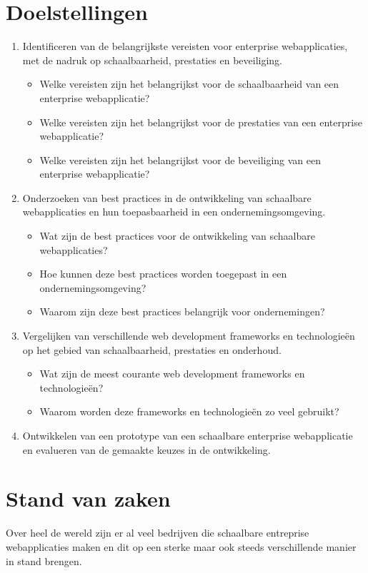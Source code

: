 \documentclass{hogent-article}
\begin{document}
\begin{samenvatting}
\section*{Doelstellingen}
\begin{enumerate}
  \item Identificeren van de belangrijkste vereisten voor enterprise webapplicaties, met de nadruk op schaalbaarheid, prestaties en beveiliging.
    \begin{itemize}
      \item Welke vereisten zijn het belangrijkst voor de schaalbaarheid van een enterprise webapplicatie?
      \item Welke vereisten zijn het belangrijkst voor de prestaties van een enterprise webapplicatie?
      \item Welke vereisten zijn het belangrijkst voor de beveiliging van een enterprise webapplicatie?
    \end{itemize}
  \item Onderzoeken van best practices in de ontwikkeling van schaalbare webapplicaties en hun toepasbaarheid in een ondernemingsomgeving.
    \begin{itemize}
      \item Wat zijn de best practices voor de ontwikkeling van schaalbare webapplicaties?
      \item Hoe kunnen deze best practices worden toegepast in een ondernemingsomgeving?
      \item Waarom zijn deze best practices belangrijk voor ondernemingen?
    \end{itemize}
  \item Vergelijken van verschillende web development frameworks en technologieën op het gebied van schaalbaarheid, prestaties en onderhoud.
    \begin{itemize}
      \item Wat zijn de meest courante web development frameworks en technologieën?
      \item Waarom worden deze frameworks en technologieën zo veel gebruikt?
    \end{itemize}
  \item Ontwikkelen van een prototype van een schaalbare enterprise webapplicatie en evalueren van de gemaakte keuzes in de ontwikkeling.
\end{enumerate}

\section*{Stand van zaken}
Over heel de wereld zijn er al veel bedrijven die schaalbare entreprise webapplicaties maken en dit op een sterke maar ook steeds verschillende manier in stand brengen.


\end{samenvatting}
\end{document}
